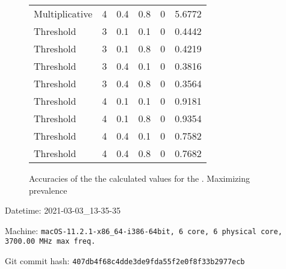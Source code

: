 \documentclass{article}
\begin{document}
\begin{figure}[H]
\begin{tabular}{lrrrrr}
 Multiplicative &       4 &   0.4 &            0.8 &       0 &            5.6772 \\
 Threshold      &       3 &   0.1 &            0.1 &       0 &            0.4442 \\
 Threshold      &       3 &   0.1 &            0.8 &       0 &            0.4219 \\
 Threshold      &       3 &   0.4 &            0.1 &       0 &            0.3816 \\
 Threshold      &       3 &   0.4 &            0.8 &       0 &            0.3564 \\
 Threshold      &       4 &   0.1 &            0.1 &       0 &            0.9181 \\
 Threshold      &       4 &   0.1 &            0.8 &       0 &            0.9354 \\
 Threshold      &       4 &   0.4 &            0.1 &       0 &            0.7582 \\
 Threshold      &       4 &   0.4 &            0.8 &       0 &            0.7682 \\
\hline
\end{tabular}
\caption{Accuracies of the the calculated values for the \penetrances. Maximizing prevalence}
\end{figure}
Datetime: 2021-03-03\_13-35-35

Machine: \texttt{macOS-11.2.1-x86\_64-i386-64bit, 6 core, 6 physical core, 3700.00 MHz max freq.}

Git commit hash: \texttt{407db4f68c4dde3de9fda55f2e0f8f33b2977ecb}
\end{document}
